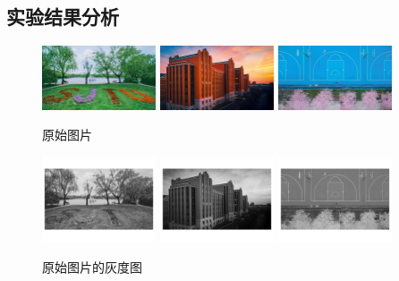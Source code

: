 \documentclass{article}
\begin{document}
\subsection{实验结果分析}

\begin{figure}[h]
    \centering
    \includegraphics[width=0.3\textwidth]{./images/img1}
    \includegraphics[width=0.3\textwidth]{./images/img2}
    \includegraphics[width=0.3\textwidth]{./images/img3}
    \caption{原始图片}
\end{figure}

\begin{figure}[h]
    \centering
    \includegraphics[width=0.3\textwidth]{./greyimages/img1}
    \includegraphics[width=0.3\textwidth]{./greyimages/img2}
    \includegraphics[width=0.3\textwidth]{./greyimages/img3}
    \caption{原始图片的灰度图}
\end{figure}
\end{document}

